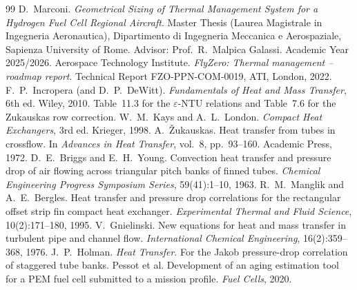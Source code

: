 \documentclass[a4paper,11pt]{article}
\begin{document}
\begin{thebibliography}{99}\small
{} D.~Marconi. \emph{Geometrical Sizing of Thermal Management System for
  a Hydrogen Fuel Cell Regional Aircraft}. Master Thesis (Laurea Magistrale in Ingegneria
  Aeronautica), Dipartimento di Ingegneria Meccanica e Aerospaziale, Sapienza University of
  Rome. Advisor: Prof.~R.~Malpica Galassi. Academic Year 2025/2026. 
 Aerospace Technology Institute. \emph{FlyZero: Thermal management --
  roadmap report}. Technical Report FZO-PPN-COM-0019, ATI, London, 2022. 
 F.~P.~Incropera (and D.~P.~DeWitt). \emph{Fundamentals of Heat and Mass
  Transfer}, 6th ed. Wiley, 2010. Table~11.3 for the $\varepsilon$-NTU relations and Table~7.6
  for the Zukauskas row correction.
 W.~M.~Kays and A.~L.~London. \emph{Compact Heat Exchangers}, 3rd ed. Krieger,
  1998. 
 A.~\v{Z}ukauskas. Heat transfer from tubes in crossflow. In
  \emph{Advances in Heat Transfer}, vol.~8, pp.~93--160. Academic Press, 1972.
 D.~E.~Briggs and E.~H.~Young. Convection heat transfer and pressure drop of
  air flowing across triangular pitch banks of finned tubes. \emph{Chemical Engineering
  Progress Symposium Series}, 59(41):1--10, 1963.
 R.~M.~Manglik and A.~E.~Bergles. Heat transfer and pressure drop
  correlations for the rectangular offset strip fin compact heat exchanger.
  \emph{Experimental Thermal and Fluid Science}, 10(2):171--180, 1995.
 V.~Gnielinski. New equations for heat and mass transfer in turbulent
  pipe and channel flow. \emph{International Chemical Engineering}, 16(2):359--368, 1976.
 J.~P.~Holman. \emph{Heat Transfer}. For the Jakob
  pressure-drop correlation of staggered tube banks.
 Pessot et al. Development of an aging estimation tool for a PEM fuel cell
  submitted to a mission profile. \emph{Fuel Cells}, 2020. 
\end{thebibliography}
\end{document}
